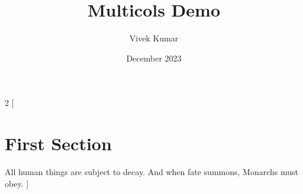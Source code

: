 \documentclass{article}
\title{Multicols Demo}
\author{Vivek Kumar}
\date{December 2023}
\begin{document}
\maketitle

\begin{multicols}{2}
[
\section{First Section}
All human things are subject to decay. And when fate summons, Monarchs must obey.
]

\blindtext
\blindtext

\end{multicols}
\end{document}
